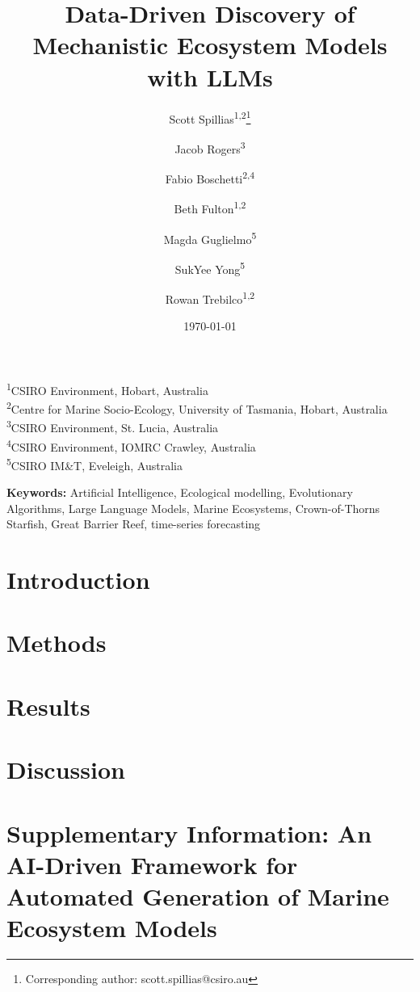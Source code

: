 \documentclass[12pt,a4paper]{article}
\title{Data-Driven Discovery of Mechanistic Ecosystem Models with LLMs}
\author{Scott Spillias\orcidlink{0000-0002-1310-5202}\textsuperscript{1,2}\thanks{Corresponding author: scott.spillias@csiro.au} \and
Jacob Rogers\orcidlink{0000-0002-4724-2555}\textsuperscript{3} \and
Fabio Boschetti\orcidlink{0000-0001-8999-6913}\textsuperscript{2,4} \and
Beth Fulton\orcidlink{0000-0002-5904-7917}\textsuperscript{1,2} \and
Magda Guglielmo\orcidlink{0000-0002-2800-0657}\textsuperscript{5} \and
SukYee Yong\orcidlink{0000-0002-5204-2902}\textsuperscript{5} \and
Rowan Trebilco\orcidlink{0000-0001-9712-8016}\textsuperscript{1,2}
}
\date{\today}
\newcommand{\keywords}{%
Artificial Intelligence,
Ecological modelling,
Evolutionary Algorithms,
Large Language Models,
Marine Ecosystems,
Crown-of-Thorns Starfish,
Great Barrier Reef,
time-series forecasting%
}
\newcommand{\affiliations}{
\noindent\textsuperscript{1}CSIRO Environment, Hobart, Australia\\
\textsuperscript{2}Centre for Marine Socio-Ecology, University of Tasmania, Hobart, Australia\\
\textsuperscript{3}CSIRO Environment, St. Lucia, Australia\\
\textsuperscript{4}CSIRO Environment, IOMRC Crawley, Australia\\
\textsuperscript{5}CSIRO IM\&T, Eveleigh, Australia\\
}
\begin{document}
\maketitle
\affiliations
\vspace{1em}

\noindent\textbf{Keywords:} \keywords
\vspace{2em}
\newpage


\section{Introduction}

\section{Methods}

\section{Results}

\section{Discussion}







\clearpage
\appendix
\clearpage
\section*{Supplementary Information: An AI-Driven Framework for Automated Generation of Marine Ecosystem Models}


\end{document}

